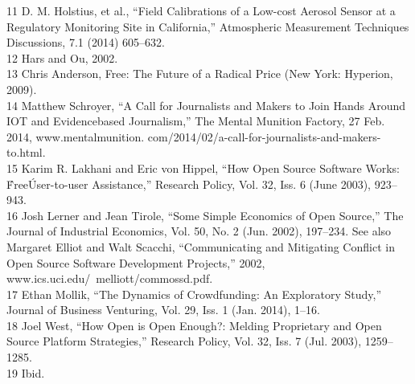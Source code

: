 11 D. M. Holstius, et al., ``Field Calibrations of a Low-cost Aerosol Sensor at a Regulatory Monitoring
Site in California,'' Atmospheric Measurement Techniques Discussions, 7.1 (2014) 605–632.\\
12 Hars and Ou, 2002.\\
13 Chris Anderson, Free: The Future of a Radical Price (New York: Hyperion, 2009).\\
14 Matthew Schroyer, ``A Call for Journalists and Makers to Join Hands Around IOT and Evidencebased
Journalism,'' The Mental Munition Factory, 27 Feb. 2014, www.mentalmunition.
com/2014/02/a-call-for-journalists-and-makers-to.html.\\
15 Karim R. Lakhani and Eric von Hippel, ``How Open Source Software Works: \'Free\' User-to-user
Assistance,'' Research Policy, Vol. 32, Iss. 6 (June 2003), 923–943.\\
16 Josh Lerner and Jean Tirole, ``Some Simple Economics of Open Source,'' The Journal of Industrial
Economics, Vol. 50, No. 2 (Jun. 2002), 197–234. See also Margaret Elliot and Walt Scacchi,
``Communicating and Mitigating Conflict in Open Source Software Development Projects,'' 2002,
www.ics.uci.edu/~melliott/commossd.pdf.\\
17 Ethan Mollik, ``The Dynamics of Crowdfunding: An Exploratory Study,'' Journal of Business
Venturing, Vol. 29, Iss. 1 (Jan. 2014), 1–16.\\
18 Joel West, ``How Open is Open Enough?: Melding Proprietary and Open Source Platform
Strategies,'' Research Policy, Vol. 32, Iss. 7 (Jul. 2003), 1259–1285.\\
19 Ibid.\\

